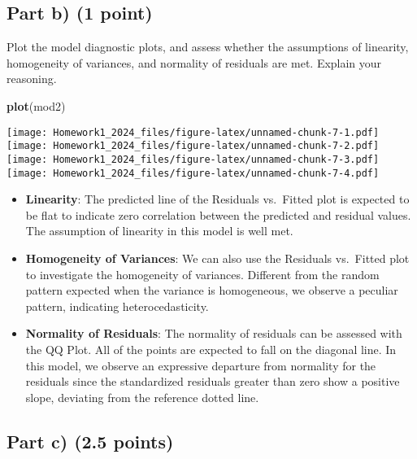 \documentclass[
]{article}
\newenvironment{Shaded}{\begin{snugshade}}{\end{snugshade}}
\newcommand{\FunctionTok}[1]{\textcolor[rgb]{0.13,0.29,0.53}{\textbf{#1}}}
\newcommand{\NormalTok}[1]{#1}
\begin{document}
\hypertarget{part-b-1-point}{%
\subsection{\texorpdfstring{Part b) \textbf{(1
point)}}{Part b) (1 point)}}\label{part-b-1-point}}

Plot the model diagnostic plots, and assess whether the assumptions of
linearity, homogeneity of variances, and normality of residuals are met.
Explain your reasoning.

\begin{Shaded}
\begin{Highlighting}[]
\FunctionTok{plot}\NormalTok{(mod2)}
\end{Highlighting}
\end{Shaded}

\texttt{[image: Homework1\_2024\_files/figure-latex/unnamed-chunk-7-1.pdf]}
\texttt{[image: Homework1\_2024\_files/figure-latex/unnamed-chunk-7-2.pdf]}
\texttt{[image: Homework1\_2024\_files/figure-latex/unnamed-chunk-7-3.pdf]}
\texttt{[image: Homework1\_2024\_files/figure-latex/unnamed-chunk-7-4.pdf]}

\begin{itemize}
\item
  \textbf{Linearity}: The predicted line of the Residuals vs.~Fitted
  plot is expected to be flat to indicate zero correlation between the
  predicted and residual values. The assumption of linearity in this
  model is well met.
\item
  \textbf{Homogeneity of Variances}: We can also use the Residuals
  vs.~Fitted plot to investigate the homogeneity of variances. Different
  from the random pattern expected when the variance is homogeneous, we
  observe a peculiar pattern, indicating heterocedasticity.
\item
  \textbf{Normality of Residuals}: The normality of residuals can be
  assessed with the QQ Plot. All of the points are expected to fall on
  the diagonal line. In this model, we observe an expressive departure
  from normality for the residuals since the standardized residuals
  greater than zero show a positive slope, deviating from the reference
  dotted line.
\end{itemize}

\hypertarget{part-c-2.5-points}{%
\subsection{\texorpdfstring{Part c) \textbf{(2.5
points)}}{Part c) (2.5 points)}}\label{part-c-2.5-points}}
\end{document}
